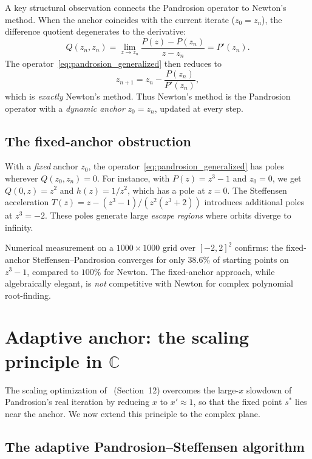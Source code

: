 \documentclass[10pt,a4paper,oneside]{book}
\theoremstyle{definition}
\theoremstyle{remark}
\newcommand{\CC}{\mathbb{C}}
\begin{document}
A key structural observation connects the Pandrosion operator to Newton's method.  When the anchor coincides with the current iterate ($z_0 = z_n$), the difference quotient degenerates to the derivative:
\[
  Q(z_n, z_n) = \lim_{z \to z_n} \frac{P(z) - P(z_n)}{z - z_n} = P'(z_n).
\]
The operator~\eqref{eq:pandrosion_generalized} then reduces to
\[
  z_{n+1} = z_n - \frac{P(z_n)}{P'(z_n)},
\]
which is \emph{exactly} Newton's method.  Thus Newton's method is the Pandrosion operator with a \emph{dynamic anchor} $z_0 = z_n$, updated at every step.

\subsection{The fixed-anchor obstruction}

With a \emph{fixed} anchor $z_0$, the operator~\eqref{eq:pandrosion_generalized} has poles wherever $Q(z_0, z_n) = 0$.  For instance, with $P(z) = z^3 - 1$ and $z_0 = 0$, we get $Q(0,z) = z^2$ and $h(z) = 1/z^2$, which has a pole at $z = 0$.  The Steffensen acceleration $T(z) = z - (z^3-1)/(z^2(z^3+2))$ introduces additional poles at $z^3 = -2$.  These poles generate large \emph{escape regions} where orbits diverge to infinity.

Numerical measurement on a $1000 \times 1000$ grid over $[-2,2]^2$ confirms: the fixed-anchor Steffensen--Pandrosion converges for only $38.6\%$ of starting points on $z^3 - 1$, compared to $100\%$ for Newton.  The fixed-anchor approach, while algebraically elegant, is \emph{not} competitive with Newton for complex polynomial root-finding.

\section{Adaptive anchor: the scaling principle in $\CC$}
\label{sec:adaptive}

The scaling optimization of~\cite{besevic2026} (Section~12) overcomes the large-$x$ slowdown of Pandrosion's real iteration by reducing $x$ to $x' \approx 1$, so that the fixed point $s^*$ lies near the anchor.  We now extend this principle to the complex plane.

\subsection{The adaptive Pandrosion--Steffensen algorithm}
\end{document}
